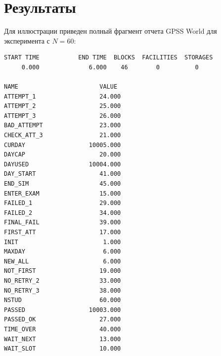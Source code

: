 \documentclass[a4paper, 14pt]{extarticle}
\begin{document}
\section{Результаты}
Для иллюстрации приведен полный фрагмент отчета GPSS World для эксперимента с $N=60$:

\begin{longlisting}
\caption{Отчет GPSS World Simulation Report для эксперимента $N=60$}
\begin{verbatim}
START TIME           END TIME  BLOCKS  FACILITIES  STORAGES
     0.000              6.000    46        0          0

NAME                       VALUE  
ATTEMPT_1                  24.000
ATTEMPT_2                  25.000
ATTEMPT_3                  26.000
BAD_ATTEMPT                23.000
CHECK_ATT_3                21.000
CURDAY                  10005.000
DAYCAP                     20.000
DAYUSED                 10004.000
DAY_START                  41.000
END_SIM                    45.000
ENTER_EXAM                 15.000
FAILED_1                   29.000
FAILED_2                   34.000
FINAL_FAIL                 39.000
FIRST_ATT                  17.000
INIT                        1.000
MAXDAY                      6.000
NEW_ALL                     6.000
NOT_FIRST                  19.000
NO_RETRY_2                 33.000
NO_RETRY_3                 38.000
NSTUD                      60.000
PASSED                  10003.000
PASSED_OK                  27.000
TIME_OVER                  40.000
WAIT_NEXT                  13.000
WAIT_SLOT                  10.000


\end{verbatim}
\end{longlisting}
\end{document}
